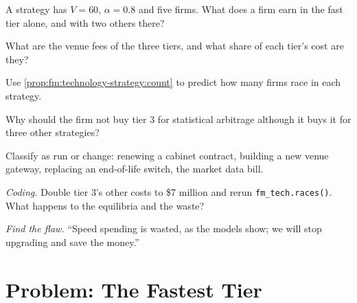 \begin{exercise}[$\star$]\label{exo:fm:technology-strategy:2}
A strategy has $V=60$, $\alpha=0.8$ and five firms. What does a firm earn in the fast tier alone, and with two others there?
\end{exercise}

\begin{exercise}[$\star$]\label{exo:fm:technology-strategy:3}
What are the venue fees of the three tiers, and what share of each tier's cost are they?
\end{exercise}

\begin{exercise}[$\star\star$]\label{exo:fm:technology-strategy:4}
Use \cref{prop:fm:technology-strategy:count} to predict how many firms race in each strategy.
\end{exercise}

\begin{exercise}[$\star\star$]\label{exo:fm:technology-strategy:5}
Why should the firm not buy tier 3 for statistical arbitrage although it buys it for three other strategies?
\end{exercise}

\begin{exercise}[$\star\star$]\label{exo:fm:technology-strategy:6}
Classify as run or change: renewing a cabinet contract, building a new venue gateway, replacing an end-of-life switch, the market data bill.
\end{exercise}

\begin{exercise}[$\star\star\star$]\label{exo:fm:technology-strategy:7}
\emph{Coding.} Double tier 3's other costs to \$7 million and rerun \texttt{fm\_tech.races()}. What happens to the equilibria and the waste?
\end{exercise}

\begin{exercise}[$\star\star\star$]\label{exo:fm:technology-strategy:8}
\emph{Find the flaw.} ``Speed spending is wasted, as the models show; we will stop upgrading and save the money.''
\end{exercise}

\section{Problem: The Fastest Tier}

